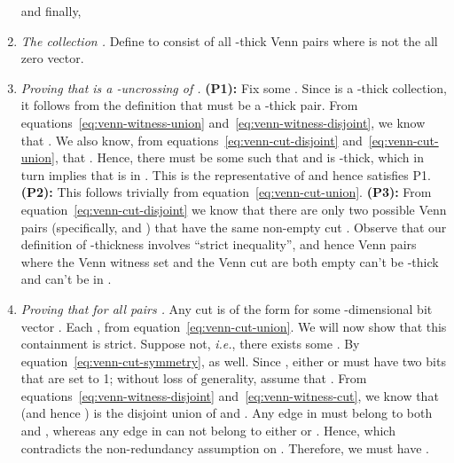 \documentclass[11pt]{article}
\newenvironment{proofnoqed}{{\bf Proof:}}{}
\begin{document}
\begin{proofnoqed}
\begin{enumerate}
 and finally,
 

\item{\em The collection .} Define  to consist of all
  -thick Venn pairs  where  is not the all zero
  vector.

\item{\em Proving that  is a -uncrossing of .}  {\bf
    (P1):} Fix some . Since  is a -thick
  collection, it follows from the definition that  must be a
  -thick pair. From equations~\ref{eq:venn-witness-union}
  and~\ref{eq:venn-witness-disjoint}, we know that . We also know, from
  equations~\ref{eq:venn-cut-disjoint} and~\ref{eq:venn-cut-union}, that . Hence, there must be some  such that  and  is -thick,
  which in turn implies that  is in . This is the
  representative of  and hence  satisfies P1.  {\bf
    (P2):} This follows trivially from equation~\ref{eq:venn-cut-union}.  {\bf
    (P3):} From equation~\ref{eq:venn-cut-disjoint} we know that there are
  only two possible Venn pairs (specifically,  and
  ) that have the same non-empty cut
  . Observe that our definition of -thickness involves
  ``strict inequality'', and hence Venn pairs where the Venn witness set and
  the Venn cut are both empty can't be -thick and can't be in
  .

\item {\em Proving that  for all pairs .}
  Any cut  is of the form  for some
  -dimensional bit vector . Each , from
  equation~\ref{eq:venn-cut-union}. We will now show that this containment is
  strict. Suppose not, {\em i.e.}, there exists some . By
  equation~\ref{eq:venn-cut-symmetry},  as well. Since
  , either  or  must have two bits that are set to 1;
  without loss of generality, assume that . From
  equations~\ref{eq:venn-witness-disjoint} and~\ref{eq:venn-witness-cut}, we
  know that  (and hence ) is the disjoint union of  and
  . Any edge in  must belong to both 
  and , whereas any edge in  can not belong to
  either  or . Hence,  which contradicts the non-redundancy assumption on
  . Therefore, we must have . 
\end{enumerate}
\end{proofnoqed}
\end{document}
